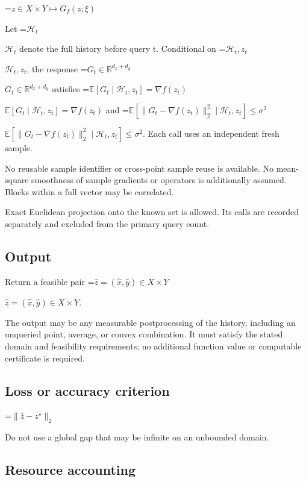 \documentclass[10pt,a4paper]{article}
\newcommand{\AtlasMath}[1]{\par\begingroup\centering\setbox0=\hbox{$\displaystyle #1$}\ifdim\wd0>1.4\linewidth\typeout{ATLAS WIDE FORMULA: \the\wd0}\fi\ifdim\wd0>\linewidth\resizebox{\linewidth}{!}{\box0}\else\box0\fi\par\endgroup}
\newcommand{\AtlasInlineMath}[1]{\begingroup\setbox0=\hbox{$#1$}\ifdim\wd0>.4\linewidth\endgroup\AtlasMath{#1}\else\endgroup$#1$\fi}
\begin{document}
\AtlasMath{z\in X\times Y\longmapsto G_f(z;\xi)}




Let \AtlasInlineMath{\mathcal H_t} denote the full history before query t. Conditional on \AtlasInlineMath{\mathcal H_t,z_t}, the response \AtlasInlineMath{G_t\in\mathbb R^{d_x+d_y}} satisfies \AtlasInlineMath{\mathbb E[G_t\mid\mathcal H_t,z_t]=\nabla f(z_t)} and \AtlasInlineMath{\mathbb E[\|G_t-\nabla f(z_t)\|_2^2\mid\mathcal H_t,z_t]\le\sigma^2}. Each call uses an independent fresh sample.



No reusable sample identifier or cross-point sample reuse is available. No mean-square smoothness of sample gradients or operators is additionally assumed. Blocks within a full vector may be correlated.



Exact Euclidean projection onto the known set is allowed. Its calls are recorded separately and excluded from the primary query count.



\subsection{Output}


Return a feasible pair \AtlasInlineMath{\widehat{z}=(\widehat{x},\widehat{y})\in X\times Y}.



The output may be any measurable postprocessing of the history, including an unqueried point, average, or convex combination. It must satisfy the stated domain and feasibility requirements; no additional function value or computable certificate is required.



\subsection{Loss or accuracy criterion}



\AtlasMath{\|\widehat{z}-z^\star\|_2}




Do not use a global gap that may be infinite on an unbounded domain.



\subsection{Resource accounting}
\end{document}
